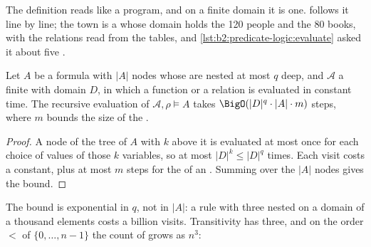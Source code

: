 The definition reads like a program, and on a finite domain it is one.  follows
it line by line; the town is a  whose domain holds the 120 people and the 80 books, with the relations read
from the tables, and \cref{lst:b2:predicate-logic:evaluate} asked it about five .

\label{lst:b2:predicate-logic:structure}

\begin{proposition}\label{prop:b2:predicate-logic:evaluation-cost}
Let $A$ be a formula with $|A|$ nodes whose  are nested at most $q$ deep, and $\mathcal{A}$ a finite
 with domain $D$, in which a function or a relation is evaluated in constant time. The recursive evaluation of
$\mathcal{A}, \rho \models A$ takes $\BigO(|D|^q \cdot |A| \cdot m)$ steps, where $m$ bounds the size of the .
\end{proposition}

\begin{proof}
A node of the tree of $A$ with $k$  above it is evaluated at most once for each choice of values of those
$k$ variables, so at most $|D|^k \leq |D|^q$ times. Each visit costs a constant, plus at most $m$ steps for the 
of an . Summing over the $|A|$ nodes gives the bound.
\end{proof}

The bound is exponential in $q$, not in $|A|$: a rule with three nested  on a domain of a thousand elements
costs a billion visits. Transitivity has three, and on the order $<$ of $\{0, \dots, n-1\}$ the count of  grows as $n^3$:

\label{lst:b2:predicate-logic:cost}

